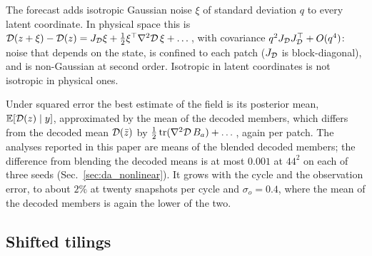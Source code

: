  The forecast adds isotropic Gaussian noise $\xi$ of
standard deviation $q$ to every latent coordinate. In physical space this
is $\mathcal{D}(z+\xi)-\mathcal{D}(z) = J_{\mathcal{D}}\xi + \tfrac12\xi^\top\nabla^2\mathcal{D}\,\xi + \dots$,
with covariance $q^2 J_{\mathcal{D}}J_{\mathcal{D}}^\top + O(q^4)$: noise that depends on
the state, is confined to each patch ($J_{\mathcal{D}}$ is block-diagonal), and
is non-Gaussian at second order. Isotropic in latent coordinates is not
isotropic in physical ones.

 Under squared error the best estimate of the field is
its posterior mean, $\mathbb{E}[\mathcal{D}(z)\mid y]$, approximated by the mean of the
decoded members, which differs from the decoded mean $\mathcal{D}(\bar z)$ by
$\tfrac12\operatorname{tr}(\nabla^2\mathcal{D}\,B_a)+\dots$, again per patch. The analyses
reported in this paper are means of the blended decoded members; the
difference from blending the decoded means is
at most $0.001$ at $44^2$ on each of three seeds (Sec.~\ref{sec:da_nonlinear}). It grows with
the cycle and the observation error, to about $2\%$ at twenty snapshots per cycle and $\sigma_o=0.4$,
where the mean of the decoded members is again the lower of the two.

\subsection{Shifted tilings}
\label{sec:tilings_method}

